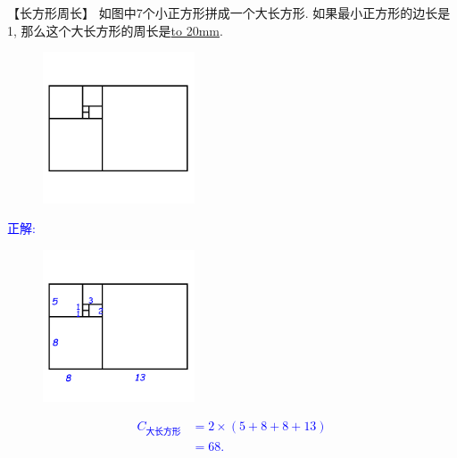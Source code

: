 \item {
    【长方形周长】
    如图中7个小正方形拼成一个大长方形. 如果最小正方形的边长是1, 那么这个大长方形的周长是\underline{\hbox to 20mm{}}.
    \begin{figure}[H] 
        \centering
        \includegraphics[width=0.4\textwidth]{./pics/Chapter_2/20.png}
    \end{figure}
    \ifshowSolution 
        \fangsong{}\textcolor{blue}{
            正解: \\
            \begin{figure}[H] 
                \centering
                \includegraphics[width=0.4\textwidth]{./pics/Chapter_2/seikai_20.png}
            \end{figure}
            \begin{align*}
                C_{大长方形} &= 2\times (5+8+8+13)\\
                &= 68.
            \end{align*}
        }
    \else
        \vspace{1cm}
    \fi
}

